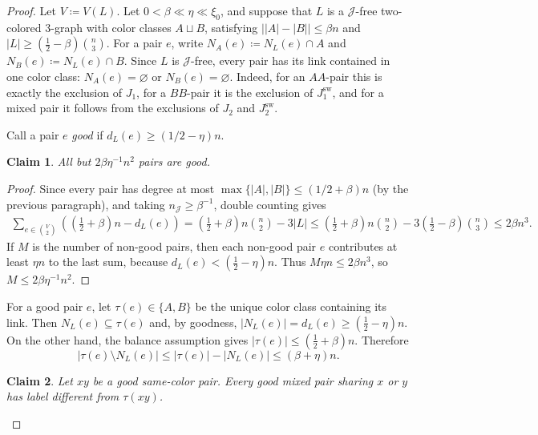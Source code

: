 \documentclass[10pt,a4paper]{amsart}
\newtheorem{claim}{Claim}
\begin{document}
\begin{proof}
Let $V\coloneqq V(L)$.
Let $0<\beta\ll\eta\ll\xi_0$, and suppose that $L$ is a $\mathcal J$-free two-colored $3$-graph with color classes $A\sqcup B$, satisfying $\bigl||A|-|B|\bigr|\le \beta n$ and $|L|\ge \left(\frac12-\beta\right)\binom n3$.
For a pair $e$, write $N_A(e)\coloneqq N_L(e)\cap A$ and $N_B(e)\coloneqq N_L(e)\cap B$. Since $L$ is $\mathcal J$-free, every pair has its link contained in one color class: $N_A(e)=\varnothing$ or $N_B(e)=\varnothing$.
Indeed, for an $AA$-pair this is exactly the exclusion of $J_1$, for a $BB$-pair it is the exclusion of $J_1^{\mathrm{sw}}$, and for a mixed pair it follows from the exclusions of $J_2$ and $J_2^{\mathrm{sw}}$.

Call a pair $e$ \emph{good} if $d_L(e)\ge (1/2-\eta)n$.

\begin{claim}\label{clm:many-good-pairs}
All but $2\beta\eta^{-1}n^2$ pairs are good.
\end{claim}

\begin{proof}
Since every pair has degree at most $\max\{|A|, |B|\} \le (1/2+\beta)n$ (by the previous paragraph), and taking $n_{\mathcal J}\ge\beta^{-1}$, double counting gives
\[
\begin{aligned}
\sum_{e\in\binom V2}\left(\left(\frac{1}{2}+\beta\right)n-d_L(e)\right)
=\left(\frac{1}{2}+\beta\right)n\binom n2-3|L| 
\le \left(\frac{1}{2}+\beta\right)n\binom n2-3\left(\frac{1}{2}-\beta\right)\binom n3 
\le 2\beta n^3.
\end{aligned}
\]
If $M$ is the number of non-good pairs, then each non-good pair $e$ contributes at least $\eta n$ to the last sum, because $d_L(e)<(\frac{1}{2}-\eta)n$.
Thus $M\eta n\le 2\beta n^3$, so $M\le 2\beta\eta^{-1}n^2$.
\end{proof}

For a good pair $e$, let $\tau(e)\in\{A,B\}$ be the unique color class containing its link.
Then $N_L(e)\subseteq \tau(e)$ and, by goodness, $|N_L(e)|=d_L(e)\ge(\frac{1}{2}-\eta)n$.
On the other hand, the balance assumption gives $|\tau(e)|\le(\frac{1}{2}+\beta)n$.
Therefore
\[
|\tau(e)\setminus N_L(e)| \le |\tau(e)|-|N_L(e)| \le (\beta+\eta)n.
\]

\begin{claim}\label{clm:label-propagation}
Let $xy$ be a good same-color pair.  Every good mixed pair sharing $x$ or $y$ has label different from $\tau(xy)$.
\end{claim}


\end{proof}
\end{document}
